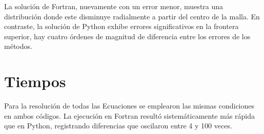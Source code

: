 \documentclass[12pt,a4paper]{article}
\begin{document}
La solución de Fortran, nuevamente con un error menor, muestra una distribución
donde este disminuye radialmente a partir del centro de la malla.
En contraste, la solución de Python exhibe errores significativos en la
frontera superior, hay cuatro órdenes de magnitud de diferencia entre los errores
de los métodos.

\section{Tiempos}%
\label{sec:Tiempos}

Para la resolución de todas las Ecuaciones se emplearon las mismas condiciones
en ambos códigos. La ejecución en Fortran resultó sistemáticamente más rápida
que en Python, registrando diferencias que oscilaron entre 4 y 100 veces.
\end{document}
